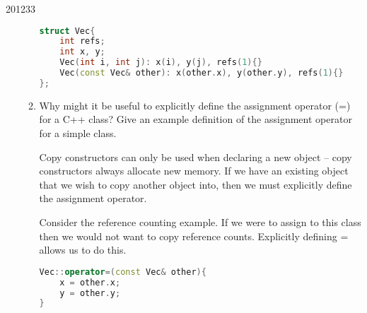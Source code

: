 \documentclass[10pt,\jkfside,a4paper]{article}
\begin{document}
\begin{examquestion}{2012}{3}{3}
\begin{enumerate}[label=(\alph*)]
\begin{enumerate}[label=(\roman*)]
\begin{lstlisting}[language=C++]
struct Vec{
	int refs;
	int x, y;
	Vec(int i, int j): x(i), y(j), refs(1){}
	Vec(const Vec& other): x(other.x), y(other.y), refs(1){}
};
\end{lstlisting}

\item Why might it be useful to explicitly define the assignment operator
(=) for a C++ class? Give an example definition of the assignment operator
for a simple class.

Copy constructors can only be used when declaring a new object -- copy
constructors always allocate new memory. If we have an existing object that
we wish to copy another object into, then we must explicitly define the
assignment operator.

Consider the reference counting example. If we were to assign to this class
then we would not want to copy reference counts. Explicitly defining =
allows us to do this.

\begin{lstlisting}[language=C++]
Vec::operator=(const Vec& other){
	x = other.x;
	y = other.y;
}
\end{lstlisting}

\end{enumerate}

\end{enumerate}

\end{examquestion}
\end{document}
